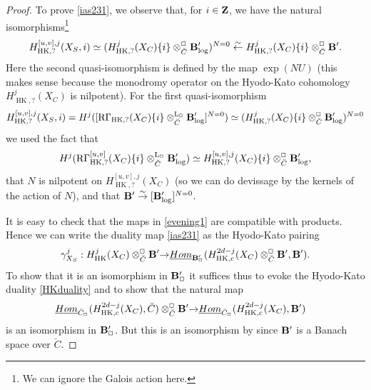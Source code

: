 \documentclass[10pt,reqno]{amsart}
\let\cal\mathcal
\theoremstyle{definition}
\theoremstyle{remark}
\newcommand{\uHom}{\underline{{\rm{Hom}} }}
\newcommand{\Hhom}{{\cal Hom}}
\newcommand{\hk}{\operatorname{HK} }
\newcommand{\LL}{\operatorname{L} }
\numberwithin{equation}{section}
\def\R{{\mathrm R}}
\numberwithin{equation}{section}
\begin{document}
\begin{proof}
   To prove \eqref{ias231}, we observe that, 
    for $i\in{\bf Z}$, we have the natural isomorphisms\footnote{We can ignore the Galois action here.}
\begin{equation}\label{evening1}
H^{{[u,v]},j}_{\hk,?}(X_S,i)  \simeq (H^j_{\hk,?}(X_C)\{i\}\otimes^{{\Box}}_{\breve{C}}\B^{\prime}_{\log})^{N=0}\stackrel{\sim}{\leftarrow} H^j_{\hk,?}(X_C)\{i\}\otimes^{{\Box}}_{\breve{C}}\B^{\prime}.
\end{equation}
Here the second quasi-isomorphism is defined by the map $\exp(NU)$ (this makes sense because the monodromy operator on the Hyodo-Kato cohomology 
$ H^j_{\hk,?}(X_C)$ is  nilpotent). For the first quasi-isomorphism 
$$
H^{{[u,v]},j}_{\hk,?}(X_S,i) =H^j([\R\Gamma_{\hk,?}(X_C)\{i\}\otimes^{\LL_{\Box}}_{\breve{C}}\B^{\prime}_{\log}]^{N=0}) 
\simeq (H^j_{\hk,?}(X_C)\{i\}\otimes^{{\Box}}_{\breve{C}}\B^{\prime}_{\log})^{N=0}
$$
we used the fact that 
$$
H^j(\R\Gamma^{{[u,v]}}_{\hk,?}(X_C)\{i\}\otimes^{\LL_{\Box}}_{\breve{C}}\B^{\prime}_{\log}) \simeq H^{{[u,v]},j}_{\hk,?}(X_C)\{i\}\otimes^{{\Box}}_{\breve{C}}\B^{\prime}_{\log},
$$
that $N$ is nilpotent on $H^{{[u,v]},j}_{\hk,?}(X_C)$ (so we can do devissage by the kernels of the action of $N$), and  that ${\bf B}^{\prime}\stackrel{\sim}{\to}[{\bf B}^{\prime}_{\log}]^{N=0}$.

  It is easy to check that the maps in \eqref{evening1} are compatible with products. Hence we can write the duality map \eqref{ias231} as the Hyodo-Kato pairing 
$$
\gamma^j_{X_S}: H^j_{\hk}(X_C)\otimes^{{\Box}}_{\breve{C}}\B^{\prime}{\to} \uHom_{\B^{\prime}_{\Box}}( H^{2d-j}_{\hk,c}(X_C)\otimes^{{\Box}}_{\breve{C}}\B^{\prime},\B^{\prime}).
$$
To show that it is an isomorphism in ${\bf B}^{\prime}_{\Box}$ it suffices thus to evoke the Hyodo-Kato duality \eqref{HKduality} and to show that  the natural map
\begin{align*}
\uHom_{\breve{C}_{\Box}}( H^{2d-j}_{\hk,c}(X_C),\breve{C})\otimes^{{\Box}}_{\breve{C}}\B^{\prime} & {\to }\uHom_{\breve{C}_{\Box}}( H^{2d-j}_{\hk,c}(X_C), \B^{\prime})
\end{align*}
is an isomorphism  in ${\bf B}_{\Box}^{\prime}$. 
But this is an isomorphism by \cite[Th.\,3.40]{RR1}
since ${\bf B}^{\prime} $ is a Banach space over $\breve{C}$. 
\end{proof}
\end{document}
